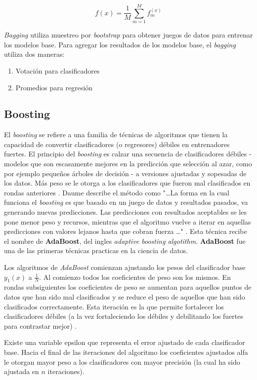 \[ f(x) = \frac{1}{M} \sum_{m=1}^M f_m^{(x)} \]

\emph{Bagging} utiliza muestreo por \emph{bootstrap} para obtener juegos de datos para entrenar los modelos base. Para agregar los resultados de los modelos base, el \emph{bagging} utiliza dos maneras:
\begin{enumerate}
  \item Votación para clasificadores
  \item Promedios para regresión
\end{enumerate}

\subsection{Boosting}
El \emph{boosting} se refiere a una familia de técnicas de algoritmos que tienen la capacidad de convertir clasificadores (o regresores) débiles en entrenadores fuertes. El principio del \emph{boosting} es calzar una secuencia de clasificadores débiles - modelos que son escasamente mejores en la predicción que selección al azar, como por ejemplo pequeños árboles de decisión - a versiones ajustadas y sopesadas de los datos. Más peso se le otorga a los clasificadores que fueron mal clasificados en rondas anteriores \cite{smolyakov}. Daume describe el método como "\ldots La forma en la cual funciona el \emph{boosting} es que basado en un juego de datos y resultados pasados, va generando nuevas predicciones. Las predicciones con resultados aceptables se les pone menor peso y recursos, mientras que el algoritmo vuelve a iterar en aquellas predicciones con valores lejanos hasta que cobran fuerza \ldots" \cite{daume}. Esta técnica recibe el nombre de \textbf{AdaBoost}, del ingles \emph{adaptive boosting algotithm}. \textbf{AdaBoost} fue una de las primeras técnicas practicas en la ciencia de datos.

Los algoritmos de \emph{AdaBoost} comienzan ajustando los pesos del clasificador base \(y_1(x)\) a \(\frac{1}{N}\). Al comienzo todos los coeficientes de peso son los mismos. En rondas subsiguientes los coeficientes de peso se aumentan para aquellos puntos de datos que han sido mal clasificados y se reduce el peso de aquellos que han sido clasificados correctamente. Esta iteración es la que permite fortalecer los clasificadores débiles (a la vez fortaleciendo los débiles y debilitando los fuertes para contrastar mejor) \cite{smolyakov}. 

Existe una variable epsilon que representa el error ajustado de cada clasificador base. Hacia el final de las iteraciones del algoritmo los coeficientes ajustados alfa le otorgan mayor peso a los clasificadores con mayor precisión (la cual ha sido ajustada en \(n\) iteraciones). 

